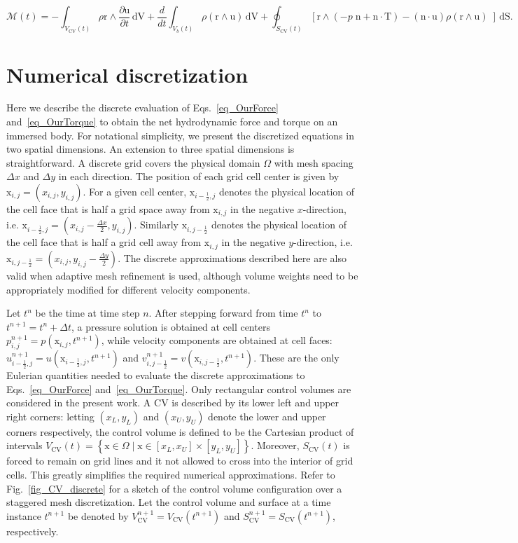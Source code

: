 \documentclass[review]{elsarticle}
\renewcommand{\vec}[1]{\bm{\mathrm{#1}}}
\def \x{\vec{x}}
\def \n{\vec{n}}
\def \r{\vec{r}}
\def \u{\vec{u}}
\def \T{\vec{T}}
\def \cM{\vec{\mathcal{M}}}
\def  \Scv{S_\text{CV}}
\def  \Scvt{S_\text{CV}(t)}
\def \Vbt{V_b(t)}
\def  \Vcv{V_\text{CV}}
\def  \Vcvt{V_\text{CV}(t)}
\def \half{\frac{1}{2}}
\def \n{\vec{n}}
\def \u{\vec{u}}
\def \x{\vec{x}}
\def \xL{x_L}
\def \yL{y_L}
\def \xU{x_U}
\def \yU{y_U}
\def \dt{\Delta t}
\def \dx{\Delta x}
\def \dy{\Delta y}
\def \dS{\,\mathrm{dS}}
\def \dV{\,\mathrm{dV}}
\def \dt{\Delta t}
\def \dx{\Delta x}
\def \ndot{\n \cdot}
\def \rcross{\r \wedge}
\begin{document}
\begin{equation}
\cM(t) = -\int_{\Vcvt} \rho \rcross \frac{\partial \u}{\partial t} \dV 
+ \frac{d}{dt} \int_{\Vbt} \rho (\rcross \u) \dV 
+ \oint_{\Scvt}  [\rcross (- p \; \n + \ndot \T) - (\ndot \u)\rho (\rcross \u) \;]  \dS.
\end{equation}


\section{Numerical discretization} \label{app_numerical_integration}

Here we describe the discrete evaluation of Eqs.~\eqref{eq_OurForce} 
and~\eqref{eq_OurTorque} to obtain the net hydrodynamic force and torque
on an immersed body.  For notational simplicity, we present the discretized
equations in two spatial dimensions. An extension to three spatial dimensions 
is straightforward. A discrete grid covers the physical domain 
$\Omega$ with mesh spacing $\dx$ and $\dy$ in each direction.
The position of each grid cell center is given by $\x_{i,j} = \left(x_{i,j},y_{i,j}\right)$. 
For a given cell center, $\x_{i-\half,j}$ denotes the physical location of the cell face 
that is half a grid space away from $\x_{i,j}$ in the negative $x$-direction, i.e. 
$\x_{i-\half,j} = \left(x_{i,j} - \frac{\dx}{2},y_{i,j}\right)$. Similarly $\x_{i,j-\half}$ denotes the
physical location of the cell face that is half a grid cell away from  $\x_{i,j}$ 
in the negative $y$-direction, i.e. $\x_{i,j-\half} = \left(x_{i,j},y_{i,j}- \frac{\dy}{2}\right)$.
The discrete approximations described here are also valid when adaptive mesh
refinement is used, although volume weights need to be appropriately
modified for different velocity components. 

Let $t^n$ be the time at time step $n$. After stepping forward from time $t^n$
to $t^{n+1} = t^n + \dt$, a pressure solution is obtained at cell centers
$p_{i,j}^{n+1} = p\left(\x_{i,j},t^{n+1}\right)$, while velocity components are obtained
at cell faces: $u_{i-\half,j}^{n+1} = u\left(\x_{i-\half,j}, t^{n+1}\right)$ and 
$v_{i,j-\half}^{n+1} = v\left(\x_{i,j-\half}, t^{n+1}\right)$. These are the only Eulerian
quantities needed to evaluate the discrete approximations to Eqs.~\eqref{eq_OurForce} 
and~\eqref{eq_OurTorque}. Only rectangular control volumes are considered in the 
present work. A CV is described by its lower left and upper right corners: letting $(\xL,\yL)$ and $(\xU,\yU)$
denote the lower and upper corners respectively, the control volume is defined to be 
the Cartesian product of intervals $\Vcvt = \left\{\x \in \Omega \mid \x \in [\xL,\xU] \times [\yL,\yU] \right\}$. 
Moreover, $\Scvt$ is forced to remain on grid lines and it not allowed to cross into the interior
of grid cells. This greatly simplifies the required numerical approximations. 
Refer to Fig.~\ref{fig_CV_discrete} for a sketch of the control volume configuration 
over a staggered mesh discretization. Let the control volume and surface at a time 
instance $t^{n+1}$ be denoted by $\Vcv^{n+1} = \Vcv(t^{n+1})$ 
and $\Scv^{n+1} = \Scv(t^{n+1})$, respectively.
\end{document}
